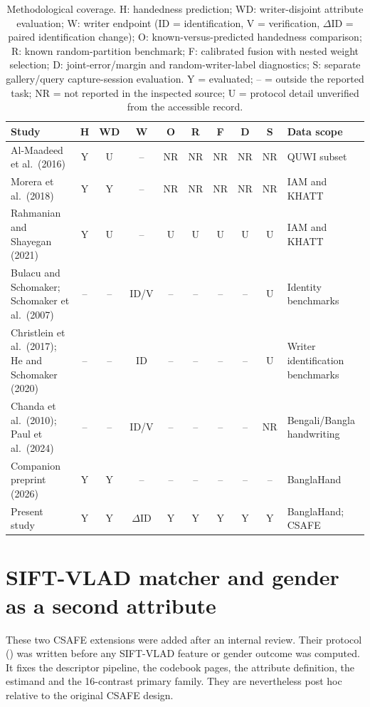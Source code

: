 \documentclass[10pt,a4paper]{article}
\begin{document}
\begin{table}[ht]
\caption{Methodological coverage. H: handedness prediction; WD: writer-disjoint attribute evaluation; W: writer endpoint (ID = identification, V = verification, $\Delta$ID = paired identification change); O: known-versus-predicted handedness comparison; R: known random-partition benchmark; F: calibrated fusion with nested weight selection; D: joint-error/margin and random-writer-label diagnostics; S: separate gallery/query capture-session evaluation. Y = evaluated; -- = outside the reported task; NR = not reported in the inspected source; U = protocol detail unverified from the accessible record.}\label{tab:coverage}
\centering\footnotesize
\setlength{\tabcolsep}{4pt}
\begin{tabularx}{\textwidth}{@{}>{\raggedright\arraybackslash}p{}ccccccccX@{}}\toprule
Study & H & WD & W & O & R & F & D & S & Data scope\\\midrule
Al-Maadeed et al.\ (2016) & Y & U & -- & NR & NR & NR & NR & NR & QUWI subset\\
Morera et al.\ (2018) & Y & Y & -- & NR & NR & NR & NR & NR & IAM and KHATT\\
Rahmanian and Shayegan (2021) & Y & U & -- & U & U & U & U & U & IAM and KHATT\\
Bulacu and Schomaker; Schomaker et al.\ (2007) & -- & -- & ID/V & -- & -- & -- & -- & U & Identity benchmarks\\
Christlein et al.\ (2017); He and Schomaker (2020) & -- & -- & ID & -- & -- & -- & -- & U & Writer identification benchmarks\\
Chanda et al.\ (2010); Paul et al.\ (2024) & -- & -- & ID/V & -- & -- & -- & -- & NR & Bengali/Bangla handwriting\\
Companion preprint (2026) & Y & Y & -- & -- & -- & -- & -- & -- & BanglaHand\\
Present study & Y & Y & $\Delta$ID & Y & Y & Y & Y & Y & BanglaHand; CSAFE\\\bottomrule
\end{tabularx}
\end{table}


\FloatBarrier
\section{SIFT-VLAD matcher and gender as a second attribute}
\label{sec:supextensions}
These two CSAFE extensions were added after an internal review. Their protocol () was written before any SIFT-VLAD feature or gender outcome was computed. It fixes the descriptor pipeline, the codebook pages, the attribute definition, the estimand and the 16-contrast primary family. They are nevertheless post hoc relative to the original CSAFE design.
\end{document}

